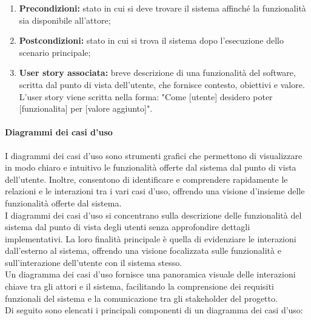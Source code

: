\begin{enumerate}
    \item \textbf{Precondizioni:} stato in cui si deve trovare il sistema affinché la funzionalità sia disponibile all'attore;
    \item \textbf{Postcondizioni:} stato in cui si trova il sistema dopo l'esecuzione dello scenario principale;
    \item \textbf{User story associata:} breve descrizione di una funzionalità del software, scritta dal punto di vista dell'utente, che fornisce contesto, obiettivi e valore. \\
    L'user story viene scritta nella forma: "Come [utente] desidero poter [funzionalita] per [valore aggiunto]".
\end{enumerate}

\paragraph{Diagrammi dei casi d'uso} 
I diagrammi dei casi d'uso sono strumenti grafici che permettono di visualizzare in modo chiaro e intuitivo le funzionalità offerte dal sistema dal punto di vista dell'utente. Inoltre, consentono di identificare e comprendere rapidamente le relazioni e le interazioni tra i vari casi d'uso, offrendo una visione d'insieme delle funzionalità offerte dal sistema.\\
I diagrammi dei casi d'uso si concentrano sulla descrizione delle funzionalità del sistema dal punto di vista degli utenti senza approfondire dettagli implementativi. La loro finalità principale è quella di evidenziare le interazioni dall'esterno al sistema, offrendo una visione focalizzata sulle funzionalità e sull'interazione dell'utente con il sistema stesso. \\
Un diagramma dei casi d'uso fornisce una panoramica visuale delle interazioni chiave tra gli attori e il sistema, facilitando la comprensione dei requisiti funzionali del sistema e la comunicazione tra gli stakeholder del progetto. \\
Di seguito sono elencati i principali componenti di un diagramma dei casi d'uso:

